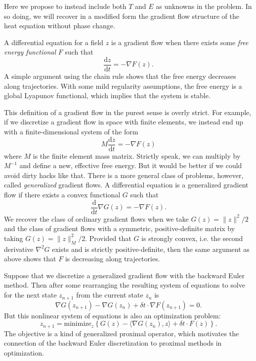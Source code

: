 \documentclass{article}
\theoremstyle{definition}
\theoremstyle{plain}
\begin{document}
Here we propose to instead include both $T$ and $E$ as unknowns in the problem.
In so doing, we will recover in a modified form the gradient flow structure of the heat equation without phase change.

A differential equation for a field $z$ is a gradient flow when there exists some \emph{free energy functional} $F$ such that
\begin{equation}
    \frac{\mathrm dz}{\mathrm dt} = -\nabla F(z).
\end{equation}
A simple argument using the chain rule shows that the free energy decreases along trajectories.
With some mild regularity assumptions, the free energy is a global Lyapunov functional, which implies that the system is stable.

This definition of a gradient flow in the purest sense is overly strict.
For example, if we discretize a gradient flow in space with finite elements, we instead end up with a finite-dimensional system of the form
\begin{equation}
    M\frac{\mathrm dz}{\mathrm dt} = -\nabla F(z)
\end{equation}
where $M$ is the finite element mass matrix.
Strictly speak, we can multiply by $M^{-1}$ and define a new, effective free energy.
But it would be better if we could avoid dirty hacks like that.
There is a more general class of problems, however, called \emph{generalized} gradient flows.
A differential equation is a generalized gradient flow if there exists a convex functional $G$ such that
\begin{equation}
    \frac{\mathrm d}{\mathrm dt}\nabla G(z) = -\nabla F(z).
\end{equation}
We recover the class of ordinary gradient flows when we take $G(z) = \|z\|^2/2$ and the class of gradient flows with a symmetric, positive-definite matrix by taking $G(z) = \|z\|_M^2 / 2$.
Provided that $G$ is strongly convex, i.e. the second derivative $\nabla^2G$ exists and is strictly positive-definite, then the same argument as above shows that $F$ is decreasing along trajectories.

Suppose that we discretize a generalized gradient flow with the backward Euler method.
Then after some rearranging the resulting system of equations to solve for the next state $z_{n + 1}$ from the current state $z_n$ is
\begin{equation}
    \nabla G(z_{n + 1}) - \nabla G(z_n) + \delta t\cdot \nabla F(z_{n + 1}) = 0.
\end{equation}
But this nonlinear system of equations is also an optimization problem:
\begin{equation}
    z_{n + 1} = \text{minimize}_z\left\{G(z) - \langle \nabla G(z_n), z\rangle + \delta t\cdot F(z)\right\}.
\end{equation}
The objective is a kind of generalized proximal operator, which motivates the connection of the backward Euler discretization to proximal methods in optimization.
\end{document}
